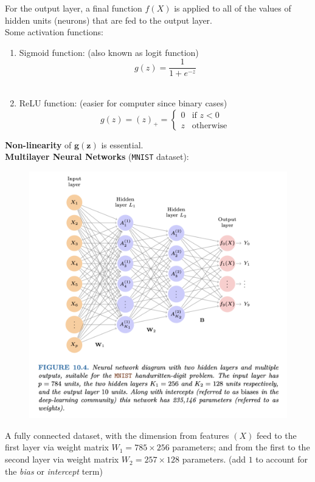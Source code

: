 \documentclass{article}
\begin{document}
For the output layer, a final function $f(X)$ is applied to all of the values of hidden units (neurons) that are fed to the output layer.\\

Some activation functions: \\
\begin{enumerate}
    \item Sigmoid function: (also known as logit function)\\
    \[\displaystyle g(z) = \frac{1}{1 + e^{-z}}\]\\

    \item ReLU function: (easier for computer since binary cases)\\

    \[g(z) = (z)_+ = \begin{cases}
        0 & \text{if } z < 0\\
        z & \text{otherwise}
    \end{cases}\]
\end{enumerate}

\textbf{Non-linearity} of $\boldsymbol{g(z)}$ is essential.\\


\textbf{Multilayer Neural Networks} (\texttt{MNIST} dataset):

\begin{figure}[h!]
    \centering
    \includegraphics[width=0.75\linewidth]{MLNN.png}
\end{figure}

A fully connected dataset, with the dimension from features $(X)$ feed to the first layer via weight matrix $W_1 = 785 \times 256$ parameters; and from the first to the second layer via weight matrix $W_2 = 257 \times 128$ parameters. (add $1$ to account for the \textit{bias} or \textit{intercept} term)\\
\end{document}
